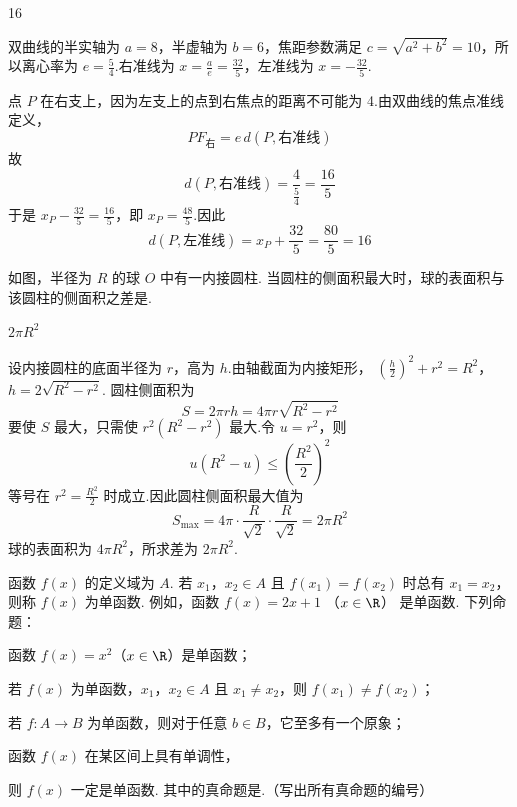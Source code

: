 \begin{answer}
16
\end{answer}

\begin{solution}
双曲线的半实轴为 \(a=8\)，半虚轴为 \(b=6\)，焦距参数满足 \(c=\sqrt{a^2+b^2}=10\)，所以离心率为 \(e=\frac54\).右准线为 \(x=\frac{a}{e}=\frac{32}{5}\)，左准线为 \(x=-\frac{32}{5}\).

点 \(P\) 在右支上，因为左支上的点到右焦点的距离不可能为 4.由双曲线的焦点准线定义，
\[
PF_{\text{右}}=e\,d(P,\text{右准线})
\]
故
\[
d(P,\text{右准线})=\frac{4}{\frac{5}{4}}=\frac{16}{5}
\]
于是 \(x_P-\frac{32}{5}=\frac{16}{5}\)，即 \(x_P=\frac{48}{5}\).因此
\[
d(P,\text{左准线})=x_P+\frac{32}{5}=\frac{80}{5}=16
\]
\end{solution}

\begin{problem}
如图，半径为 \(R\) 的球 \(O\) 中有一内接圆柱. 当圆柱的侧面积最大时，球的表面积与该圆柱的侧面积之差是\fillinblank{}.

\end{problem}

\begin{answer}
\(2\pi R^2\)
\end{answer}

\begin{solution}
设内接圆柱的底面半径为 \(r\)，高为 \(h\).由轴截面为内接矩形，
\(\left(\frac h2\right)^2+r^2=R^2\)，\(h=2\sqrt{R^2-r^2}\).
圆柱侧面积为
\[
S=2\pi rh=4\pi r\sqrt{R^2-r^2}
\]
要使 \(S\) 最大，只需使 \(r^2(R^2-r^2)\) 最大.令 \(u=r^2\)，则
\[
u(R^2-u)\leqslant\left(\frac{R^2}{2}\right)^2
\]
等号在 \(r^2=\frac{R^2}{2}\) 时成立.因此圆柱侧面积最大值为
\[
S_{\max}=4\pi\cdot\frac{R}{\sqrt2}\cdot\frac{R}{\sqrt2}=2\pi R^2
\]
球的表面积为 \(4\pi R^2\)，所求差为 \(2\pi R^2\).
\end{solution}

\begin{problem}
函数 \( f(x) \) 的定义域为 \(A\). 若 \(x_{1}\)，\(x_{2} \in A\) 且 \( f(x_{1}) = f(x_{2}) \) 时总有 \( x_{1} = x_{2} \)，则称 \( f(x) \) 为单函数. 例如，函数 \( f(x) = 2x + 1\) （\(x \in \R\)） 是单函数. 下列命题：
\begin{circlelist}
\item 函数 \( f(x)=x^{2} \)（\(x\in\R\)）是单函数；
\item 若 \(f(x)\) 为单函数，\(x_{1}\)，\(x_{2} \in A\) 且 \(x_{1} \neq x_{2}\)，则 \(f(x_{1}) \neq f(x_{2})\)；
\item 若 \(f: A \to B\) 为单函数，则对于任意 \(b \in B\)，它至多有一个原象；
\item 函数 \(f(x)\) 在某区间上具有单调性，
\end{circlelist}
则 \(f(x)\) 一定是单函数. 其中的真命题是\fillinblank{}.（写出所有真命题的编号）
\end{problem}

